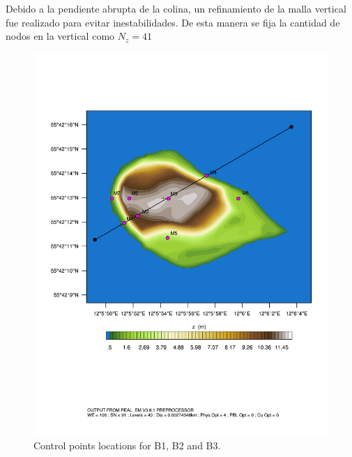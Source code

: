 Debido a la pendiente abrupta de la colina, un refinamiento de la malla vertical fue realizado para evitar inestabilidades. De esta manera se fija la cantidad de nodos en la vertical como $N_z=41$

\begin{figure}[H]
	\centering
	\includegraphics[width=0.6\linewidth,page=1,trim={0cm 6cm -1cm 4cm},clip]{Imagenes/05/bol_control_point.pdf}%
	\caption{Control points locations for B1, B2 and B3.}
	\label{fig:05_d08_bol}
\end{figure}

